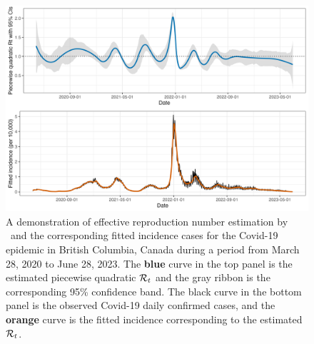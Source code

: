 \begin{figure}[tb]
    \centering
    \includegraphics[width=.99\textwidth]{fig/intro-fig-new.png}
    \caption{A demonstration of effective reproduction number estimation 
    by \RtEstim\ and the corresponding fitted incidence cases for the Covid-19 epidemic 
    in British Columbia, Canada during a period from March 28, 2020 to June 28, 2023. 
    The \textcolor{customblue}{\textbf{blue}} curve in the top panel is the estimated piecewise
    quadratic $\mathcal{R}_t$ and the gray ribbon is the corresponding 95\% confidence band. 
    The black curve in the bottom panel is the observed Covid-19 daily confirmed 
    cases, and the \textcolor{customorange}{\textbf{orange}} curve is the fitted incidence 
    corresponding to the estimated $\mathcal{R}_t$.}
    \label{fig:intro-fig}
\end{figure}

